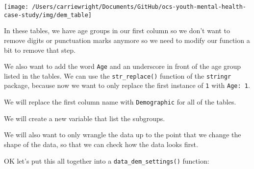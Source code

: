 \documentclass[
]{article}
\begin{document}
\begin{center}\texttt{[image: /Users/carriewright/Documents/GitHub/ocs-youth-mental-health-case-study/img/dem\_table]} \end{center}

In these tables, we have age groups in our first column so we don't want
to remove digits or punctuation marks anymore so we need to modify our
function a bit to remove that step.

We also want to add the word \texttt{Age} and an underscore in front of
the age group listed in the tables. We can use the
\texttt{str\_replace()} function of the \texttt{stringr} package,
because now we want to only replace the first instance of \texttt{1}
with \texttt{Age:\ 1}.

We will replace the first column name with \texttt{Demographic} for all
of the tables.

We will create a new variable that list the subgroups.

We will also want to only wrangle the data up to the point that we
change the shape of the data, so that we can check how the data looks
first.

OK let's put this all together into a \texttt{data\_dem\_settings()}
function:
\end{document}

